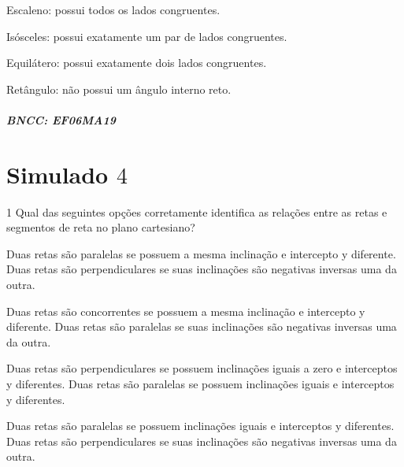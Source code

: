 \begin{escolha}
\item Escaleno: possui todos os lados congruentes.
\item Isósceles: possui exatamente um par de lados congruentes.
\item Equilátero: possui exatamente dois lados congruentes.
\item Retângulo: não possui um ângulo interno reto.
\end{escolha}

\paragraph{BNCC: EF06MA19 }


\chapter{Simulado $4$}

\num{1}  Qual das seguintes opções corretamente identifica as relações entre
as retas e segmentos de reta no plano cartesiano?

\begin{escolha}
\item Duas retas são paralelas se possuem a mesma inclinação e intercepto y
diferente. Duas retas são perpendiculares se suas inclinações são
negativas inversas uma da outra.
\item Duas retas são concorrentes se possuem a mesma inclinação e
intercepto y diferente. Duas retas são paralelas se suas inclinações são
negativas inversas uma da outra.
\item Duas retas são perpendiculares se possuem inclinações iguais a zero e
interceptos y diferentes. Duas retas são paralelas se possuem
inclinações iguais e interceptos y diferentes.
\item Duas retas são paralelas se possuem inclinações iguais e interceptos
y diferentes. Duas retas são perpendiculares se suas inclinações são
negativas inversas uma da outra.
\end{escolha}

